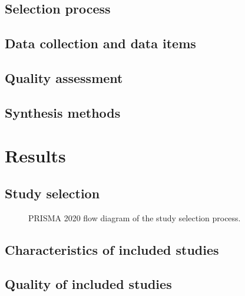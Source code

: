 \documentclass[11pt,a4paper]{article}
\begin{document}
\subsection{Selection process}

\subsection{Data collection and data items}

\subsection{Quality assessment}

\subsection{Synthesis methods}

\section{Results}\label{sec:results}
\subsection{Study selection}
\begin{figure}[t]
\centering
\resizebox{\linewidth}{!}{}
\caption{PRISMA 2020 flow diagram of the study selection process.}\label{fig:prisma}
\end{figure}

\subsection{Characteristics of included studies}

\subsection{Quality of included studies}
\end{document}

